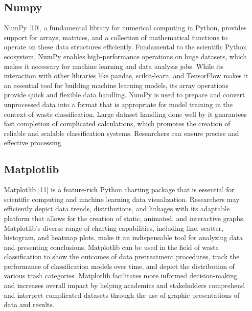\subsection{Numpy}
NumPy [10], a fundamental library for numerical computing in Python, provides support for arrays, matrices, and a collection of mathematical functions to operate on these data structures efficiently. Fundamental to the scientific Python ecosystem, NumPy enables high-performance operations on huge datasets, which makes it necessary for machine learning and data analysis jobs. While its interaction with other libraries like pandas, scikit-learn, and TensorFlow makes it an essential tool for building machine learning models, its array operations provide quick and flexible data handling. NumPy is used to prepare and convert unprocessed data into a format that is appropriate for model training in the context of waste classification. Large dataset handling done well by it guarantees fast completion of complicated calculations, which promotes the creation of reliable and scalable classification systems. Researchers can ensure precise and effective processing.

\subsection{Matplotlib}
Matplotlib [11] is a feature-rich Python charting package that is essential for scientific computing and machine learning data visualization. Researchers may efficiently depict data trends, distributions, and linkages with its adaptable platform that allows for the creation of static, animated, and interactive graphs. Matplotlib's diverse range of charting capabilities, including line, scatter, histogram, and heatmap plots, make it an indispensable tool for analyzing data and presenting conclusions. Matplotlib can be used in the field of waste classification to show the outcomes of data pretreatment procedures, track the performance of classification models over time, and depict the distribution of various trash categories. Matplotlib facilitates more informed decision-making and increases overall impact by helping academics and stakeholders comprehend and interpret complicated datasets through the use of graphic presentations of data and results.

